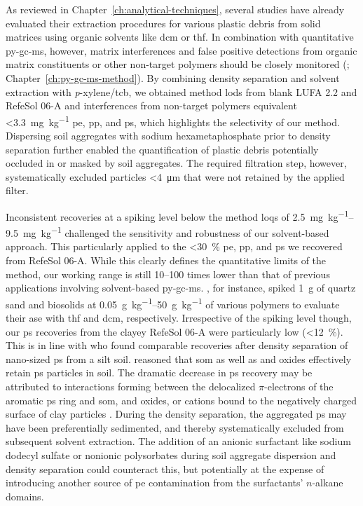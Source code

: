 As reviewed in Chapter~\ref{ch:analytical-techniques}, several studies have already evaluated their extraction procedures for various plastic debris from solid matrices using organic solvents like \ac{dcm} or \ac{thf}. In combination with quantitative \ac{py-gc-ms}, however, matrix interferences and false positive detections from organic matrix constituents or other non-target polymers should be closely monitored (\citealp{DierkesQuantification2019}; Chapter~\ref{ch:py-gc-ms-method}).
By combining density separation and solvent extraction with \textit{p}-xylene/\ac{tcb}, we obtained method \acp{lod} from blank LUFA 2.2 and RefeSol 06-A and interferences from non-target polymers equivalent \SI{<3.3}{\milli\gram\per\kilo\gram} \ac{pe}, \ac{pp}, and \ac{ps}, which highlights the selectivity of our method. Dispersing soil aggregates with sodium hexametaphosphate prior to density separation further enabled the quantification of plastic debris potentially occluded in or masked by soil aggregates. The required filtration step, however, systematically excluded particles \SI{<4}{\micro\meter} that were not retained by the applied filter.

Inconsistent recoveries at a spiking level below the method \acp{loq} of \SIrange[range-phrase={ to }]{2.5}{9.5}{\milli\gram\per\kilo\gram} challenged the sensitivity and robustness of our solvent-based approach. This particularly applied to the \SI{<30}{\percent} \ac{pe}, \ac{pp}, and \ac{ps} we recovered from RefeSol 06-A. While this clearly defines the quantitative limits of the method, our working range is still \numrange{10}{100} times lower than that of previous applications involving solvent-based \ac{py-gc-ms}. , for instance, spiked \SI{1}{\gram} of quartz sand and biosolids at \SIrange{0.05}{50}{\gram\per\kilo\gram} of various polymers to evaluate their \ac{ase} with \ac{thf} and \ac{dcm}, respectively.
Irrespective of the spiking level though, our \ac{ps} recoveries from the clayey RefeSol 06-A were particularly low (\SI{<12}{\percent}). This is in line with \citet{WangPoor2018} who found comparable recoveries after density separation of nano-sized \ac{ps} from a silt soil. \citet{LuoDistribution2020,WuTransport2020} reasoned that \ac{som} as well as  and  oxides effectively retain \ac{ps} particles in soil. The dramatic decrease in \ac{ps} recovery may be attributed to interactions forming between the delocalized $\pi$-electrons of the aromatic \ac{ps} ring and \ac{som},  and  oxides, or cations bound to the negatively charged surface of clay particles \citep{NewcombDeveloping2017}. During the density separation, the aggregated \ac{ps} may have been preferentially sedimented, and thereby systematically excluded from subsequent solvent extraction. The addition of an anionic surfactant like sodium dodecyl sulfate or nonionic polysorbates during soil aggregate dispersion and density separation could counteract this, but potentially at the expense of introducing another source of \ac{pe} contamination from the surfactants' $n$-alkane domains.

